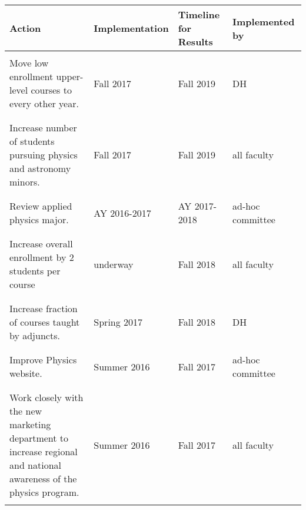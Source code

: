 \documentclass[12pt]{article}
\begin{document}
\begin{table}[h]
\begin{tabular}{|p{2.5in}|p{1.25in}|p{1.25in}|p{1in}|}
\hline
{\bf Action} & {\bf Implementation} & {\bf Timeline for Results}  & {\bf Implemented by}\\
\hline \hline
 & & & \\ 
Move low enrollment upper-level courses to every other year. & Fall 2017 & Fall 2019 & DH\\ &  & &  \\ \hline
 & & & \\
Increase number of students pursuing physics and astronomy minors. & Fall 2017 & Fall 2019 & all faculty\\ &  & &  \\ \hline
 & & & \\ 
Review applied physics major. & AY 2016-2017 & AY 2017-2018 & ad-hoc ~~~~ committee\\  & & & \\ \hline
 & &  &\\ 
Increase overall enrollment by 2 students per course &underway & Fall 2018 & all faculty \\ & & & \\ \hline

 & &  &\\ 
Increase fraction of courses taught by adjuncts. & Spring 2017 & Fall 2018 & DH \\
 & & & \\  \hline

& & & \\ 
Improve Physics website. & Summer 2016 & Fall 2017 & ad-hoc ~~~~ committee \\
 & & & \\  \hline

& &  & \\ Work closely with the new marketing department  to increase regional and national awareness of the physics program.& Summer 2016 & Fall 2017 & all faculty \\
 & & & \\  \hline
\hline
\end{tabular}
\end{table}
\end{document}
